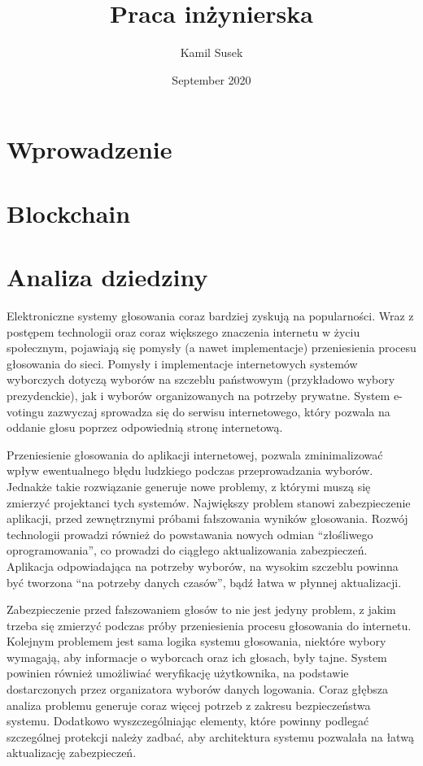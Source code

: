 \documentclass{report}
\begin{document}
\begin{titlepage}

\title{Praca inżynierska}
\author{Kamil Susek}
\date{September 2020}

\maketitle
\end{titlepage}
\chapter{Wprowadzenie}
\newpage
\chapter{Blockchain}
\newpage
\chapter{Analiza dziedziny}
Elektroniczne systemy głosowania coraz bardziej zyskują na popularności.
Wraz z postępem technologii oraz coraz większego znaczenia internetu w życiu 
społecznym, pojawiają się pomysły (a nawet implementacje) przeniesienia procesu głosowania do sieci. Pomysły i implementacje internetowych systemów wyborczych dotyczą wyborów na szczeblu państwowym (przykładowo wybory prezydenckie), jak i wyborów organizowanych na potrzeby prywatne. System e-votingu zazwyczaj sprowadza się do serwisu internetowego, który pozwala na oddanie głosu poprzez odpowiednią stronę internetową. 

Przeniesienie głosowania do aplikacji internetowej, pozwala zminimalizować wpływ ewentualnego błędu ludzkiego podczas przeprowadzania wyborów. Jednakże takie rozwiązanie generuje nowe problemy, z którymi muszą się zmierzyć projektanci tych systemów. Największy problem stanowi zabezpieczenie aplikacji, przed zewnętrznymi próbami fałszowania wyników głosowania. Rozwój technologii prowadzi również do powstawania nowych odmian “złośliwego oprogramowania”, co prowadzi do ciągłego aktualizowania zabezpieczeń. Aplikacja odpowiadająca na potrzeby wyborów, na wysokim szczeblu powinna być tworzona “na potrzeby danych czasów”, bądź łatwa w płynnej aktualizacji.

Zabezpieczenie przed fałszowaniem głosów to nie jest jedyny problem, z jakim trzeba się zmierzyć podczas próby przeniesienia procesu głosowania do internetu. Kolejnym problemem jest sama logika systemu głosowania, niektóre wybory wymagają, aby informacje o wyborcach oraz ich głosach, były tajne. System powinien również umożliwiać weryfikację użytkownika, na podstawie dostarczonych przez organizatora wyborów danych logowania. Coraz głębsza analiza problemu generuje coraz więcej potrzeb z zakresu bezpieczeństwa systemu. Dodatkowo wyszczególniając elementy, które powinny podlegać szczególnej protekcji należy zadbać, aby architektura systemu pozwalała na łatwą aktualizację zabezpieczeń.
\end{document}
